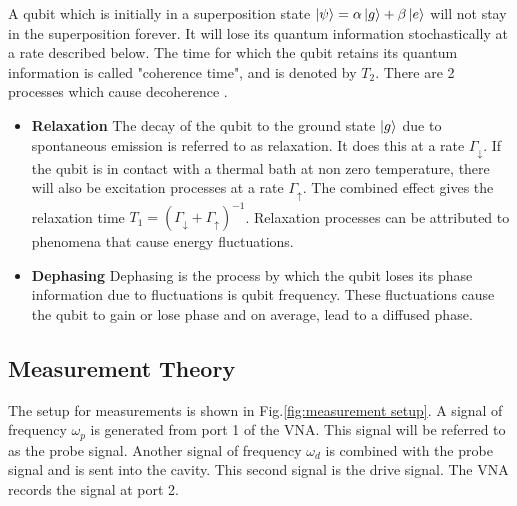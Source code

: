 A qubit which is initially in a superposition state $\ket{\psi} = \alpha\ket{g}+\beta\ket{e}$ will not stay in the superposition forever. It will lose its quantum information stochastically at a rate described below. The time for which the qubit retains its quantum information is called "coherence time", and is denoted by $T_2$. There are 2 processes which cause decoherence \cite{Geerlings2013}.
\begin{itemize}
\item \textbf{Relaxation}
The decay of the qubit to the ground state $\ket{g}$ due to spontaneous emission is referred to as relaxation. It does this at a rate $\Gamma_{\downarrow}$. If the qubit is in contact with a thermal bath at non zero temperature, there will also be excitation processes at a rate $\Gamma_{\uparrow}$. The combined effect gives the relaxation time $T_1 = \left(\Gamma_{\downarrow}+\Gamma_{\uparrow}\right)^{-1}$. Relaxation processes can be attributed to phenomena that cause energy fluctuations.
\item \textbf{Dephasing}
Dephasing is the process by which the qubit loses its phase information due to fluctuations is qubit frequency. These fluctuations cause the qubit to gain or lose phase and on average, lead to a diffused phase.
\end{itemize}

\subsection{Measurement Theory}

The setup for measurements is shown in Fig.\ref{fig:measurement setup}. A signal of frequency $\omega_p$ is generated from port 1 of the VNA. This signal will be referred to as the probe signal. Another signal of frequency $\omega_d$ is combined with the probe signal and is sent into the cavity. This second signal is the drive signal. The VNA records the signal at port 2.

